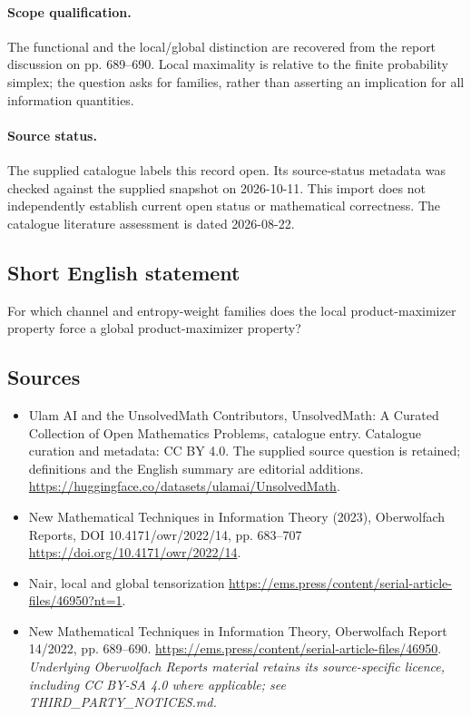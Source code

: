 \documentclass[11pt]{article}
\begin{document}
\paragraph{Scope qualification.}
The functional and the local/global distinction are recovered from the report discussion on pp. 689--690. Local maximality is relative to the finite probability simplex; the question asks for families, rather than asserting an implication for all information quantities.
\paragraph{Source status.}
The supplied catalogue labels this record open. Its source-status metadata was checked against the supplied snapshot on 2026-10-11. This import does not independently establish current open status or mathematical correctness. The catalogue literature assessment is dated 2026-08-22.
\subsection{Short English statement}
For which channel and entropy-weight families does the local product-maximizer property force a global product-maximizer property?
\subsection{Sources}
\begin{itemize}
\item[S1] Ulam AI and the UnsolvedMath Contributors, UnsolvedMath: A Curated Collection of Open Mathematics Problems, catalogue entry. Catalogue curation and metadata: CC BY 4.0. The supplied source question is retained; definitions and the English summary are editorial additions.
\url{https://huggingface.co/datasets/ulamai/UnsolvedMath}.
\item[S2] New Mathematical Techniques in Information Theory (2023), Oberwolfach Reports, DOI 10.4171/owr/2022/14, pp. 683--707
\url{https://doi.org/10.4171/owr/2022/14}.
\item[S3] Nair, local and global tensorization
\url{https://ems.press/content/serial-article-files/46950?nt=1}.
\item[S4] New Mathematical Techniques in Information Theory, Oberwolfach Report 14/2022, pp. 689--690.
\url{https://ems.press/content/serial-article-files/46950}.
\textit{Underlying Oberwolfach Reports material retains its source-specific licence, including CC BY-SA 4.0 where applicable; see THIRD\_PARTY\_NOTICES.md.}
\end{itemize}
\end{document}
